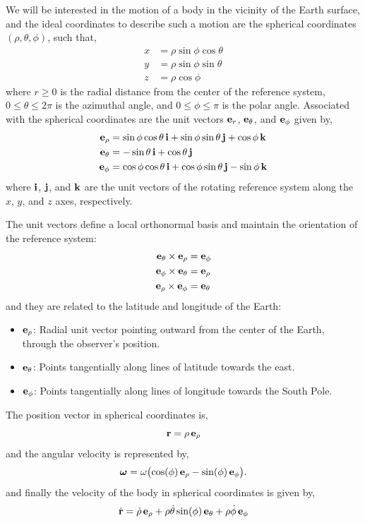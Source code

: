 \documentclass[12pt]{article}
\begin{document}
We will be interested in the motion of a body in the vicinity of the Earth surface, and the
ideal coordinates to describe such a motion are the spherical coordinates $(\rho, \theta,
\phi)$, such that,
\begin{align}
  x &= \rho\sin\phi\cos\theta \\
  y &= \rho\sin\phi\sin\theta \\
  z &= \rho\cos\phi
\end{align}
where $r \geq 0$ is the radial distance from the center of the reference system,
$0 \leq \theta \leq 2\pi$ is the azimuthal angle, and $0 \leq \phi \leq \pi$ is the polar
angle. Associated with the spherical coordinates are the unit vectors $\vb{e}_r$,
$\vb{e}_\theta$, and $\vb{e}_\phi$ given by,
\begin{align}
  \vb{e}_\rho   &= \sin\phi\cos\theta\,\vb{i} + \sin\phi\sin\theta\,\vb{j} + \cos\phi\,\vb{k} \\
  \vb{e}_\theta &= -\sin\theta\,\vb{i} + \cos\theta\,\vb{j} \\
  \vb{e}_\phi   &= \cos\phi\cos\theta\,\vb{i} + \cos\phi\sin\theta\,\vb{j} - \sin\phi\,\vb{k}
\end{align}
where $\vb{i}$, $\vb{j}$, and $\vb{k}$ are the unit vectors of the rotating reference system
along the $x$, $y$, and $z$ axes, respectively.

The unit vectors define a local orthonormal basis and maintain the orientation of the
reference system:
\begin{align}
  \vb{e}_\theta \times \vb{e}_\rho &= \vb{e}_\phi \\
  \vb{e}_\phi   \times \vb{e}_\theta &= \vb{e}_\rho \\
  \vb{e}_\rho   \times \vb{e}_\phi &= \vb{e}_\theta
\end{align}
and they are related to the latitude and longitude of the Earth:
\begin{itemize}
  \item $\vb{e}_\rho$: Radial unit vector pointing outward from the center of the Earth,
        through the observer's position.
  \item $\vb{e}_\theta$: Points tangentially along lines of latitude towards the east.
  \item $\vb{e}_\phi$: Points tangentially along lines of longitude towards the South Pole.
\end{itemize}

The position vector in spherical coordinates is,
\begin{equation}
  \vb{r} = \rho\,\vb{e}_\rho
\end{equation}
and the angular velocity is represented by,
\begin{equation}
  \boldsymbol{\omega} = \omega\bigl(\cos(\phi)\,\vb{e}_\rho - \sin(\phi)\,\vb{e}_\phi\bigr).
\end{equation}
and finally the velocity of the body in spherical coordinates is given by,
\begin{equation}
  \dot{\vb{r}} = \dot\rho\,\vb{e}_\rho + \rho\dot\theta\sin(\phi)\,\vb{e}_\theta
    + \rho\dot\phi\,\vb{e}_\phi
\end{equation}
\end{document}
